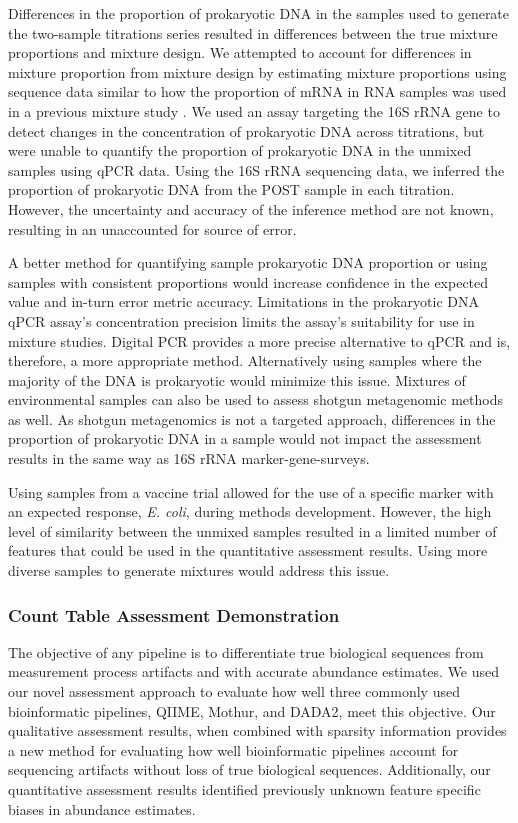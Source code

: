 \documentclass[linenumbers]{bmcart}
\begin{document}
Differences in the proportion of prokaryotic DNA in the samples used to
generate the two-sample titrations series resulted in differences
between the true mixture proportions and mixture design. We attempted to
account for differences in mixture proportion from mixture design by
estimating mixture proportions using sequence data similar to how the
proportion of mRNA in RNA samples was used in a previous mixture study
\cite{parsons2015using}. We used an assay targeting the 16S rRNA gene
to detect changes in the concentration of prokaryotic DNA across
titrations, but were unable to quantify the proportion of prokaryotic
DNA in the unmixed samples using qPCR data. Using the 16S rRNA sequencing
data, we inferred the proportion of prokaryotic DNA from the POST sample
in each titration. However, the uncertainty and accuracy of the
inference method are not known, resulting in an unaccounted for source of error.

A better method for quantifying sample prokaryotic DNA proportion or
using samples with consistent proportions would increase confidence in
the expected value and in-turn error metric accuracy. Limitations in the
prokaryotic DNA qPCR assay's concentration precision limits the
assay's suitability for use in mixture studies. Digital PCR provides a
more precise alternative to qPCR and is, therefore, a more appropriate
method. Alternatively using samples where the majority of the DNA is
prokaryotic would minimize this issue. Mixtures of environmental samples
can also be used to assess shotgun metagenomic methods as well. As
shotgun metagenomics is not a targeted approach, differences in the
proportion of prokaryotic DNA in a sample would not impact the
assessment results in the same way as 16S rRNA marker-gene-surveys.

Using samples from a vaccine trial allowed for the use of a specific
marker with an expected response, \emph{E. coli}, during methods
development. However, the high level of similarity between the unmixed
samples resulted in a limited number of features that could be used in
the quantitative assessment results. Using more diverse samples to
generate mixtures would address this issue.

\subsubsection*{Count Table Assessment Demonstration}
The objective of any pipeline is to differentiate true biological sequences from measurement process artifacts and with accurate abundance estimates.
We used our novel assessment approach to evaluate how well three commonly used bioinformatic pipelines, QIIME, Mothur, and DADA2, meet this objective.
Our qualitative assessment results, when combined with sparsity information provides a new method for evaluating how well bioinformatic pipelines account for sequencing artifacts without loss of true biological sequences.
Additionally, our quantitative assessment results identified previously unknown feature specific biases in abundance estimates.
\end{document}
